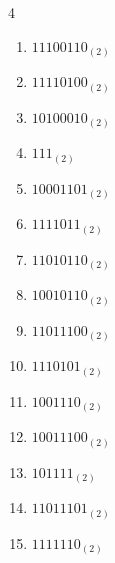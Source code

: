 \begin{multicols}{4}
\begin{enumerate}
        \phantom{$=251$}

  \item $11100110_{(2)}$

        \phantom{$=230$}

\columnbreak %

\resetques

  \item $11110100_{(2)}$

        \phantom{$=244$}

  \item $10100010_{(2)}$

        \phantom{$=162$}

  \item $111_{(2)}$

        \phantom{$=7$}

  \item $10001101_{(2)}$

        \phantom{$=141$}

  \item $1111011_{(2)}$

        \phantom{$=123$}

  \item $11010110_{(2)}$

        \phantom{$=214$}

  \item $10010110_{(2)}$

        \phantom{$=150$}

  \item $11011100_{(2)}$

        \phantom{$=220$}

  \item $1110101_{(2)}$

        \phantom{$=117$}

  \item $1001110_{(2)}$

        \phantom{$=78$}

  \item $10011100_{(2)}$

        \phantom{$=156$}

  \item $101111_{(2)}$

        \phantom{$=47$}

  \item $11011101_{(2)}$

        \phantom{$=221$}

  \item $1111110_{(2)}$


\end{enumerate}
\end{multicols}
